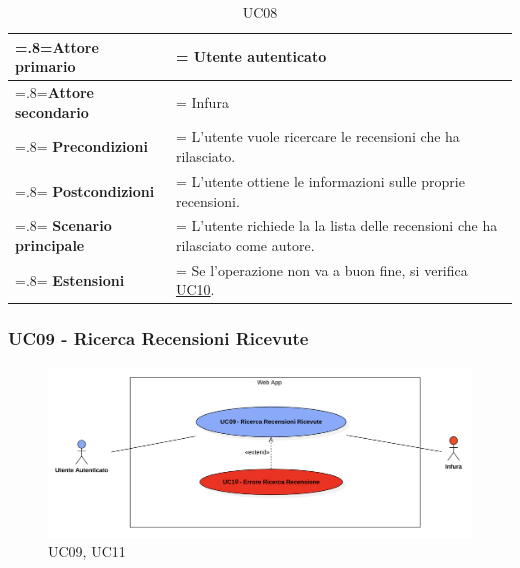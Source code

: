             \begin{table}[H]
                \centering
                \renewcommand{\arraystretch}{1.8}
                \renewcommand\tabularxcolumn[1]{m{#1}}
                \begin{tabularx}{0.9\textwidth} {
                    >{\hsize=.8\hsize\linewidth=\hsize}X
                    >{\hsize=1.2\hsize\linewidth=\hsize}X}
                    \hline
                    \textbf{Attore primario} & Utente autenticato \\
                    \hline
                    \textbf{Attore secondario} & Infura \\
                    \hline
                    \textbf{Precondizioni} & L'utente vuole ricercare le recensioni che ha rilasciato. \\
                    \hline
                    \textbf{Postcondizioni} & L'utente ottiene le informazioni sulle proprie recensioni.\\
                    \hline
                    \textbf{Scenario principale} & L'utente richiede la la lista delle recensioni che ha rilasciato come autore.\\
                    \hline
                    \textbf{Estensioni} & Se l'operazione non va a buon fine, si verifica \hyperref[UC10]{UC10}. \\
                    \hline
                \end{tabularx}
                \caption{UC08}
            \end{table}

        \subsubsection{UC09 - Ricerca Recensioni Ricevute}
        \label{UC09}

            \begin{figure}[H]
                \centering
                \includegraphics[scale=0.6]{src/img/UC09.png}
                \caption{UC09, UC11}
            \end{figure}

